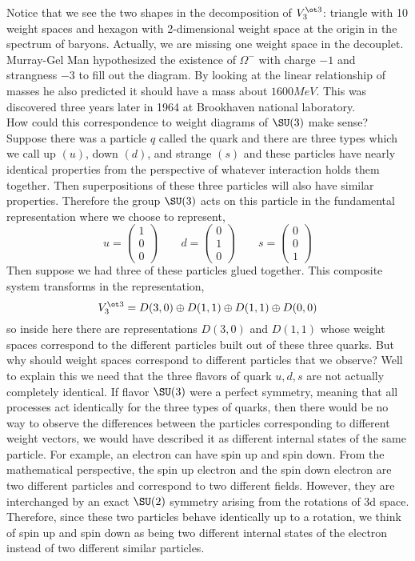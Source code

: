 \documentclass[12pt]{article}
\begin{document}
Notice that we see the two shapes in the decomposition of $V_3^{\ot 3}$: triangle with 10 weight spaces and hexagon with 2-dimensional weight space at the origin in the spectrum of baryons. Actually, we are missing one weight space in the decouplet. Murray-Gel Man hypothesized the existence of $\Omega^{-}$ with charge $-1$ and strangness $-3$ to fill out the diagram. By looking at the linear relationship of masses he also predicted it should have a mass about $1600 MeV$. This was discovered three years later in 1964 at Brookhaven national laboratory. 
\bigskip\\
How could this correspondence to weight diagrams of $\SU(3)$ make sense? Suppose there was a particle $q$ called the quark and there are three types which we call up $(u)$, down $(d)$, and strange $(s)$ and these particles have nearly identical properties from the perspective of whatever interaction holds them together. Then superpositions of these three particles will also have similar properties. Therefore the group $\SU(3)$ acts on this particle in the fundamental representation where we choose to represent,
\[ u = \begin{pmatrix}
1 
\\
0
\\
0
\end{pmatrix}
\quad \quad
d = \begin{pmatrix}
0 
\\
1
\\
0
\end{pmatrix}
\quad \quad
s = \begin{pmatrix}
0 
\\
0
\\
1
\end{pmatrix} \]
Then suppose we had three of these particles glued together. This composite system transforms in the representation,
\[ V_3^{\ot 3} = D(3,0) \oplus D(1,1) \oplus D(1,1) \oplus D(0,0) \]
so inside here there are representations $D(3,0)$ and $D(1,1)$ whose weight spaces correspond to the different particles built out of these three quarks. But why should weight spaces correspond to different particles that we observe? Well to explain this we need that the three flavors of quark $u, d, s$ are not actually completely identical. If flavor $\SU(3)$ were a perfect symmetry, meaning that all processes act identically for the three types of quarks, then there would be no way to observe the differences between the particles corresponding to different weight vectors, we would have described it as different internal states of the same particle. For example, an electron can have spin up and spin down. From the mathematical perspective, the spin up electron and the spin down electron are two different particles and correspond to two different fields. However, they are interchanged by an exact $\SU(2)$ symmetry arising from the rotations of 3d space. Therefore, since these two particles behave identically up to a rotation, we think of spin up and spin down as being two different internal states of the electron instead of two different similar particles.
\end{document}
